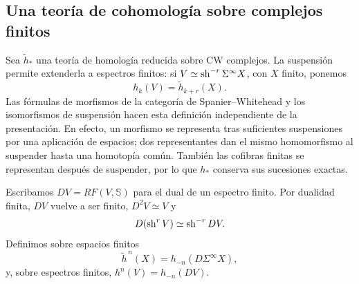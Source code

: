 \subsection{Una teoría de cohomología sobre complejos finitos}
Sea $\widetilde h_*$ una teoría de homología reducida sobre CW complejos. La suspensión permite extenderla a espectros finitos: si $V\simeq\operatorname{sh}^{-r}\Sigma^\infty X$, con $X$ finito, ponemos
\[
h_k(V)=\widetilde h_{k+r}(X).
\]
Las fórmulas de morfismos de la categoría de Spanier--Whitehead y los isomorfismos de suspensión hacen esta definición independiente de la presentación. En efecto, un morfismo se representa tras suficientes suspensiones por una aplicación de espacios; dos representantes dan el mismo homomorfismo al suspender hasta una homotopía común. También las cofibras finitas se representan después de suspender, por lo que $h_*$ conserva sus sucesiones exactas.

Escribamos $DV=RF(V,\mathbb S)$ para el dual de un espectro finito. Por dualidad finita, $DV$ vuelve a ser finito, $D^2V\simeq V$ y
\[
D(\operatorname{sh}^rV)\simeq\operatorname{sh}^{-r}DV.
\]
Definimos sobre espacios finitos
\[
\widetilde h^{\,n}(X)=h_{-n}(D\Sigma^\infty X),
\]
y, sobre espectros finitos, $h^n(V)=h_{-n}(DV)$.

